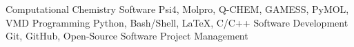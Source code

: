 

\begin{cvskills}

  \cvskill
    {Computational Chemistry Software} %
    {Psi4, Molpro, Q-CHEM, GAMESS, PyMOL, VMD} %
  \cvskill
    {Programming} %
    {Python, Bash/Shell, LaTeX, C/C++} %
  \cvskill
    {Software Development} %
    {Git, GitHub, Open-Source Software Project Management}
\end{cvskills}
